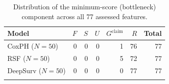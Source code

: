 \begin{table}[t]
\caption{Distribution of the minimum-score (bottleneck) component across all 77 assessed features.}
\label{tab:bottleneck-distribution}
\centering
\begin{tabular}{lrrrrrr}
\toprule
Model & $F$ & $S$ & $U$ & $G^{\mathrm{claim}}$ & $R$ & Total \\
\midrule
CoxPH ($N=50$) & 0 & 0 & 0 & 1 & 76 & 77 \\
RSF ($N=50$) & 0 & 0 & 0 & 5 & 72 & 77 \\
DeepSurv ($N=50$) & 0 & 0 & 0 & 0 & 77 & 77 \\
\botrule
\end{tabular}
\end{table}
